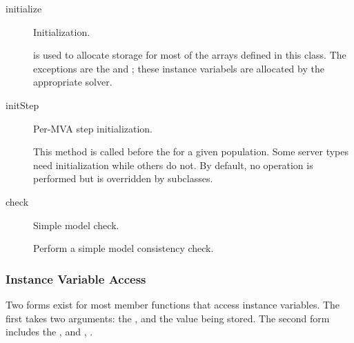 \begin{description}
\item[initialize] \texonly{---} Initialization.\\

   is used to allocate storage for most of the arrays
  defined in this class.  The exceptions are the
    and ; these instance
  variabels are allocated by the appropriate  solver.

  \label{sec:server-initstep}
\item[initStep] \texonly{---} Per-MVA step initialization.\\

  This method is called before the  for a
  given population.  Some server types need initialization while others
  do not.  By default, no operation is performed but is overridden by
  subclasses.

\item[check] \texonly{---} Simple model check.\\

  Perform a simple model consistency check.
\end{description}

\subsubsection{Instance Variable Access}

Two forms exist for most member functions that access instance
variables.  The first takes two arguments: the ,  and the
value being stored.  The second form includes the ,  and
, . 

